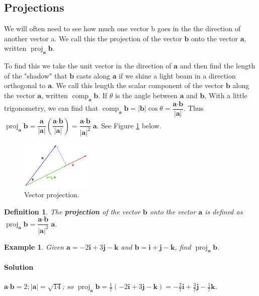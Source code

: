 \documentclass[letterpaper, 11pt, openany]{book}
\newcommand{\scdot}{\boldsymbol{\cdot}}
\newcommand{\proj}[2]{\operatorname{proj}_{\mathbf{#2}}\mathbf{#1}}
\newcommand{\comp}[2]{\operatorname{comp}_{\mathbf{#2}}\mathbf{#1}}
\theoremstyle{mytheoremstyle}
\newtheorem{definition}{Definition}[section]
\theoremstyle{myexamplestyle}
\newtheorem{example}{Example}[section]
\newenvironment{solution}{\paragraph{\sffamily \smaller \fontseries{b}\selectfont Solution}}{\hfill\faSquare}
\begin{document}
\subsection{Projections}

We will often need to see how much one vector b goes in the the direction of another vector a. We call this the projection of the vector \(\mathbf{b}\) onto the vector \(\mathbf{a}\), written \(\proj{b}{a}\).

To find this we take the unit vector in the direction of \(\mathbf{a}\) and then find the length of the "shadow" that \(\mathbf{b}\) casts along \(\mathbf{a}\) if we shine a light beam in a direction orthogonal to \(\mathbf{a}\). We call this length the scalar component of the vector \(\mathbf{b}\) along the vector \(\mathbf{a}\), written \(\comp{b}{a}\). If \(\theta\) is the angle between \(\mathbf{a}\) and \(\mathbf{b}\), With a little trigonometry, we can find that \(\comp{b}{a} = |\mathbf{b}| \cos \theta = \dfrac{\mathbf{a} \scdot \mathbf{b}}{|\mathbf{a}|}\). Thus \(\proj{b}{a} = \dfrac{\mathbf{a}}{|\mathbf{a}|}\left( \dfrac{\mathbf{a} \scdot \mathbf{b}}{|\mathbf{a}|} \right)= \dfrac{\mathbf{a} \scdot \mathbf{b}}{|\mathbf{a}|^{2}} \; \mathbf{a}\). See Figure \ref{f:vec-proj} below.

\begin{figure}[htbp]
    \centering
        \includegraphics[width=0.3\textwidth]{Figures/vect-proj.pdf}
    \caption{Vector projection.}
    \label{f:vec-proj}
\end{figure}

\begin{definition}\label{d:vector-projection}
    The \textbf{projection} of the vector \(\mathbf{b}\) onto the vector \(\mathbf{a}\) is defined as \(\proj{b}{a} = \dfrac{\mathbf{a} \scdot \mathbf{b}}{|\mathbf{a}|^{2}} \; \mathbf{a}\).
\end{definition}

\begin{example}
    Given \(\mathbf{a} = -2 \mathbf{i} + 3 \mathbf{j }- \mathbf{k}\) and \( \mathbf{b} =  \mathbf{i} + \mathbf{j} - \mathbf{k}\), find \(\proj{b}{a}\).
    \begin{solution}
        \(\mathbf{a} \scdot \mathbf{b} = 2; |\mathbf{a}| = \sqrt{14}\); so \(\proj{b}{a} = \frac{1}{7}\left(-2 \mathbf{i} + 3 \mathbf{j }- \mathbf{k}\right) = -\frac{2}{7}\mathbf{i} + \frac{3}{7}\mathbf{j} - \frac{1}{7}\mathbf{k}\).
    \end{solution}
\end{example}
\end{document}

